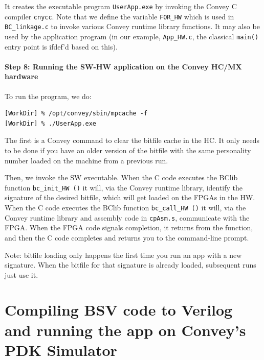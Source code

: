 \documentclass[twoside,letterpaper,11pt]{article}
\newcommand{\hm}{\hspace*{1em}}
\begin{document}
It creates the executable program \verb|UserApp.exe| by invoking the
Convey C compiler \verb|cnycc|.  Note that we define the variable
\verb|FOR_HW| which is used in \verb|BC_linkage.c| to invoke various
Convey runtime library functions.  It may also be used by the
application program (in our example, \verb|App_HW.c|, the classical
\verb|main()| entry point is ifdef'd based on this).


\paragraph{Step 8: Running the SW-HW application on the Convey HC/MX hardware}
\hm

To run the program, we do:
\begin{Verbatim}[frame=single, label=Running the SW-HW application on HC/MX hardware]
[WorkDir] % /opt/convey/sbin/mpcache -f
[WorkDir] % ./UserApp.exe
\end{Verbatim}

The first is a Convey command to clear the bitfile cache in the HC.
It only needs to be done if you have an older version of the bitfile
with the same personality number loaded on the machine from a previous
run.

Then, we invoke the SW executable.  When the C code executes the BClib
function \verb|bc_init_HW ()| it will, via the Convey runtime library,
identify the signature of the desired bitfile, which will get loaded
on the FPGAs in the HW. When the C code executes the BClib function
\verb|bc_call_HW ()| it will, via the Convey runtime library and
assembly code in \verb|cpAsm.s|, communicate with the FPGA.  When the
FPGA code signals completion, it returns from the function, and then
the C code completes and returns you to the command-line prompt.

Note: bitfile loading only happens the first time you run an app with
a new signature.  When the bitfile for that signature is already
loaded, subsequent runs just use it.


\section{Compiling BSV code to Verilog and running the app on Convey's PDK Simulator}

\label{sec_running_on_PDKsim}
\end{document}
